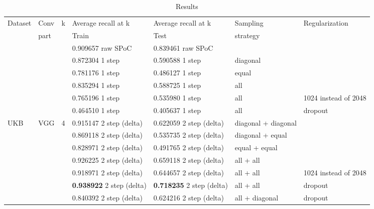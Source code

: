 \documentclass[10pt,a4paper]{article}
\begin{document}
    \begin{table}[h!]
        \label{table:main_table}
        \caption{Results}
        \begin{tabular}{|l|l|l|l|l|l|l|}
            \hline
            Dataset & Conv & k & Average recall at k & Average recall at k & Sampling & Regularization       \\
            & part & & Train & Test & strategy &                      \\ \hline
            & & & 0.909657 raw SPoC & 0.839461 raw SPoC & &                      \\ \cline{4-7}

            & & & 0.872304 1 step & 0.590588 1 step & diagonal &                      \\
            & & & 0.781176 1 step & 0.486127 1 step & equal &                      \\
            & & & 0.835294 1 step & 0.588725 1 step & all &                      \\
            & & & 0.765196 1 step & 0.535980 1 step & all & 1024 instead of 2048 \\
            & & & 0.464510 1 step & 0.405637 1 step & all & dropout              \\ \cline{4-7}

            UKB & VGG & 4 & 0.915147 2 step (delta)     & 0.622059 2 step (delta)     & diagonal + diagonal &                      \\
            & & & 0.869118 2 step (delta)     & 0.535735 2 step (delta)     & diagonal + equal &                      \\
            & & & 0.828971 2 step (delta)     & 0.491765 2 step (delta)     & equal + equal &                      \\
            & & & 0.926225 2 step (delta)     & 0.659118 2 step (delta)     & all + all &                      \\
            & & & 0.918971 2 step (delta)     & 0.644657 2 step (delta)     & all + all & 1024 instead of 2048 \\
            & & & \textbf{0.938922} 2 step (delta) & \textbf{0.718235} 2 step (delta) & all + all & dropout              \\
            & & & 0.840392 2 step (delta)     & 0.624216 2 step (delta)     & all + diagonal & dropout              \\ \cline{4-7}


\end{tabular}
\end{table}
\end{document}
